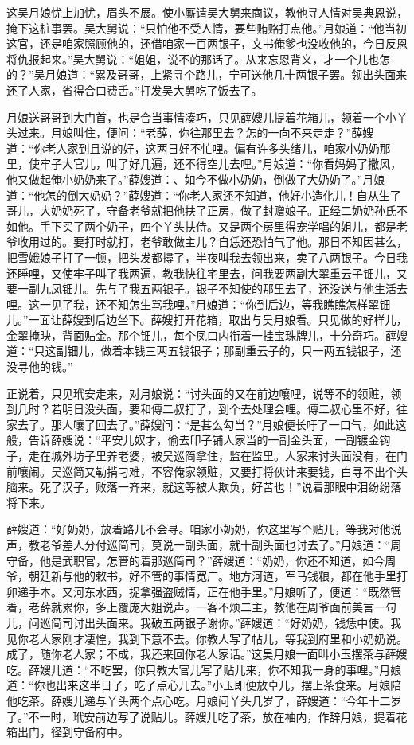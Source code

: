 这吴月娘忧上加忧，眉头不展。使小厮请吴大舅来商议，教他寻人情对吴典恩说，掩下这桩事罢。吴大舅说：“只怕他不受人情，要些贿赂打点他。”月娘道：“他当初这官，还是咱家照顾他的，还借咱家一百两银子，文书俺爹也没收他的，今日反恩将仇报起来。”吴大舅说：“姐姐，说不的那话了。从来忘恩背义，才一个儿也怎的？”吴月娘道：“累及哥哥，上紧寻个路儿，宁可送他几十两银子罢。领出头面来还了人家，省得合口费舌。”打发吴大舅吃了饭去了。

月娘送哥哥到大门首，也是合当事情凑巧，只见薛嫂儿提着花箱儿，领着一个小丫头过来。月娘叫住，便问：“老薛，你往那里去？怎的一向不来走走？”薛嫂道：“你老人家到且说的好，这两日好不忙哩。偏有许多头绪儿，咱家小奶奶那里，使牢子大官儿，叫了好几遍，还不得空儿去哩。”月娘道：“你看妈妈了撒风，他又做起俺小奶奶来了。”薛嫂道：、如今不做小奶奶，倒做了大奶奶了。”月娘道：“他怎的倒大奶奶？”薛嫂道：“你老人家还不知道，他好小造化儿！自从生了哥儿，大奶奶死了，守备老爷就把他扶了正房，做了封赠娘子。正经二奶奶孙氏不如他。手下买了两个奶子，四个丫头扶侍。又是两个房里得宠学唱的姐儿，都是老爷收用过的。要打时就打，老爷敢做主儿？自恁还恐怕气了他。那日不知因甚么，把雪娥娘子打了一顿，把头发都撏了，半夜叫我去领出来，卖了八两银子。今日我还睡哩，又使牢子叫了我两遍，教我快往宅里去，问我要两副大翠重云子钿儿，又要一副九凤钿儿。先与了我五两银子。银子不知使的那里去了，还没送与他生活去哩。这一见了我，还不知怎生骂我哩。”月娘道：“你到后边，等我瞧瞧怎样翠钿儿。”一面让薛嫂到后边坐下。薛嫂打开花箱，取出与吴月娘看。只见做的好样儿，金翠掩映，背面贴金。那个钿儿，每个凤口内衔着一挂宝珠牌儿，十分奇巧。薛嫂道：“只这副钿儿，做着本钱三两五钱银子；那副重云子的，只一两五钱银子，还没寻他的钱。”

正说着，只见玳安走来，对月娘说：“讨头面的又在前边嚷哩，说等不的领赃，领到几时？若明日没头面，要和傅二叔打了，到个去处理会哩。傅二叔心里不好，往家去了。那人嚷了回去了。”薛嫂问：“是甚么勾当？”月娘便长吁了一口气，如此这般，告诉薛嫂说：“平安儿奴才，偷去印子铺人家当的一副金头面，一副镀金钩子，走在城外坊子里养老婆，被吴巡简拿住，监在监里。人家来讨头面没有，在门前嚷闹。吴巡简又勒掯刁难，不容俺家领赃，又要打将伙计来要钱，白寻不出个头脑来。死了汉子，败落一齐来，就这等被人欺负，好苦也！”说着那眼中泪纷纷落将下来。

薛嫂道：“好奶奶，放着路儿不会寻。咱家小奶奶，你这里写个贴儿，等我对他说声，教老爷差人分付巡简司，莫说一副头面，就十副头面也讨去了。”月娘道：“周守备，他是武职官，怎管的着那巡简司？”薛嫂道：“奶奶，你还不知道，如今周爷，朝廷新与他的敕书，好不管的事情宽广。地方河道，军马钱粮，都在他手里打卯递手本。又河东水西，捉拿强盗贼情，正在他手里。”月娘听了，便道：“既然管着，老薛就累你，多上覆庞大姐说声。一客不烦二主，教他在周爷面前美言一句儿，问巡简司讨出头面来。我破五两银子谢你。”薛嫂道：“好奶奶，钱恁中使。我见你老人家刚才凄惶，我到下意不去。你教人写了帖儿，等我到府里和小奶奶说。成了，随你老人家；不成，我还来回你老人家话。”这吴月娘一面叫小玉摆茶与薛嫂吃。薛嫂儿道：“不吃罢，你只教大官儿写了贴儿来，你不知我一身的事哩。”月娘道：“你也出来这半日了，吃了点心儿去。”小玉即便放卓儿，摆上茶食来。月娘陪他吃茶。薛嫂儿递与丫头两个点心吃。月娘问丫头几岁了，薛嫂道：“今年十二岁了。”不一时，玳安前边写了说贴儿。薛嫂儿吃了茶，放在袖内，作辞月娘，提着花箱出门，径到守备府中。

